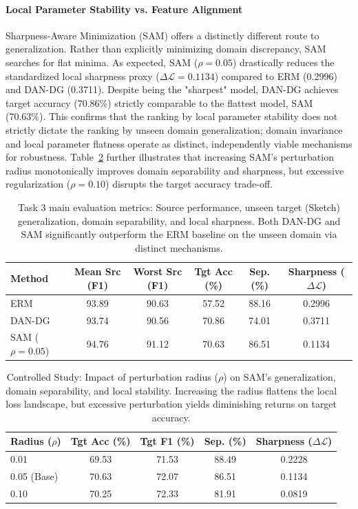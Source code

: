 \documentclass{article}
\begin{document}
\paragraph{Local Parameter Stability vs. Feature Alignment}
Sharpness-Aware Minimization (SAM) offers a distinctly different route to generalization. Rather than explicitly minimizing domain discrepancy, SAM searches for flat minima. As expected, SAM ($\rho=0.05$) drastically reduces the standardized local sharpness proxy ($\Delta \mathcal{L} = 0.1134$) compared to ERM (0.2996) and DAN-DG (0.3711). Despite being the "sharpest" model, DAN-DG achieves target accuracy (70.86\%) strictly comparable to the flattest model, SAM (70.63\%). This confirms that the ranking by local parameter stability does not strictly dictate the ranking by unseen domain generalization; domain invariance and local parameter flatness operate as distinct, independently viable mechanisms for robustness. Table~\ref{tab:task3_controlled} further illustrates that increasing SAM's perturbation radius monotonically improves domain separability and sharpness, but excessive regularization ($\rho=0.10$) disrupts the target accuracy trade-off.

\begin{table}[ht]
  \caption{Task 3 main evaluation metrics: Source performance, unseen target (Sketch) generalization, domain separability, and local sharpness. Both DAN-DG and SAM significantly outperform the ERM baseline on the unseen domain via distinct mechanisms.}
  \label{tab:task3_main}
  \centering
  \setlength{\tabcolsep}{4.5pt}
  \begin{tabular}{lccccc}
    \toprule
    Method & Mean Src (F1) & Worst Src (F1) & Tgt Acc (\%) & Sep. (\%) & Sharpness ($\Delta \mathcal{L}$) \\
    \midrule
    ERM & 93.89 & 90.63 & 57.52 & 88.16 & 0.2996 \\
    DAN-DG & 93.74 & 90.56 & 70.86 & 74.01 & 0.3711 \\
    SAM ($\rho=0.05$) & 94.76 & 91.12 & 70.63 & 86.51 & 0.1134 \\
    \bottomrule
  \end{tabular}
\end{table}

\begin{table}[ht]
  \caption{Controlled Study: Impact of perturbation radius ($\rho$) on SAM's generalization, domain separability, and local stability. Increasing the radius flattens the local loss landscape, but excessive perturbation yields diminishing returns on target accuracy.}
  \label{tab:task3_controlled}
  \centering
  \begin{tabular}{lcccc}
    \toprule
    Radius ($\rho$) & Tgt Acc (\%) & Tgt F1 (\%) & Sep. (\%) & Sharpness ($\Delta \mathcal{L}$) \\
    \midrule
    0.01 & 69.53 & 71.53 & 88.49 & 0.2228 \\
    0.05 (Base) & 70.63 & 72.07 & 86.51 & 0.1134 \\
    0.10 & 70.25 & 72.33 & 81.91 & 0.0819 \\
    \bottomrule
  \end{tabular}
\end{table}
\end{document}
